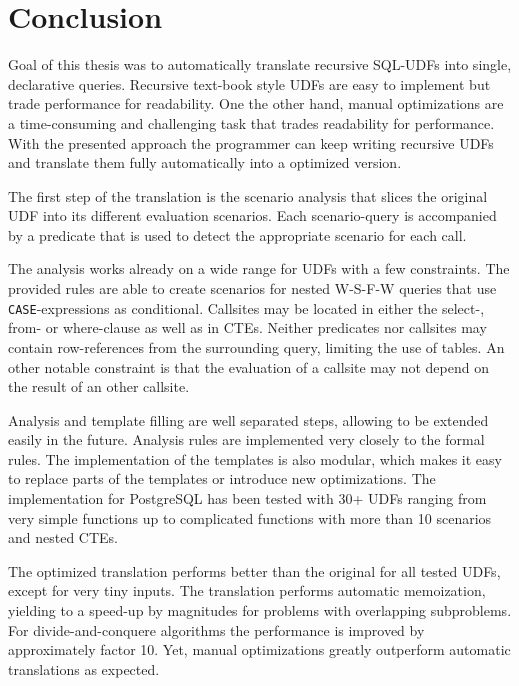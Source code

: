 \chapter{Conclusion} \label{conclusion}



Goal of this thesis was to automatically translate recursive SQL-UDFs into single, declarative queries. Recursive text-book style UDFs are easy to implement but trade performance for readability. One the other hand, manual optimizations are a time-consuming and challenging task that trades readability for performance. With the presented approach the programmer can keep writing recursive UDFs and translate them fully automatically into a optimized version.

The first step of the translation is the scenario analysis that slices the original UDF into its different evaluation scenarios. Each scenario-query is accompanied by a predicate that is used to detect the appropriate scenario for each call.

The analysis works already on a wide range for UDFs with a few constraints. The provided rules are able to create scenarios for nested W-S-F-W queries that use \texttt{CASE}-expressions as conditional. Callsites may be located in either the select-, from- or where-clause as well as in CTEs. Neither predicates nor callsites may contain row-references from the surrounding query, limiting the use of tables. An other notable constraint is that the evaluation of a callsite may not depend on the result of an other callsite.

Analysis and template filling are well separated steps, allowing to be extended easily in the future. Analysis rules are implemented very closely to the formal rules. The implementation of the templates is also modular, which makes it easy to replace parts of the templates or introduce new optimizations. The implementation for PostgreSQL has been tested with 30+ UDFs ranging from very simple functions up to complicated functions with more than 10 scenarios and nested CTEs.

The optimized translation performs better than the original for all tested UDFs, except for very tiny inputs. The translation performs automatic memoization, yielding to a speed-up by magnitudes for problems with overlapping subproblems. For divide-and-conquere algorithms the performance is improved by approximately factor 10. Yet, manual optimizations greatly outperform automatic translations as expected.

